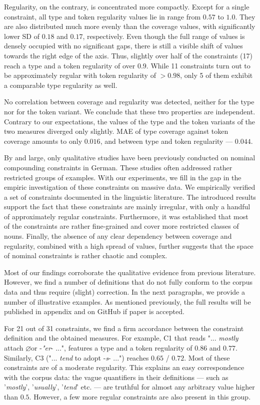 \documentclass[10pt, a4paper]{article}
\newcommand{\zeroLinker}{\ensuremath{\boldsymbol{\varnothing}}}
\begin{document}
Regularity, on the contrary, is concentrated more compactly. Except for a single constraint, all type and token regularity values lie in range from $0.57$ to $1.0$. They are also distributed much more evenly than the coverage values, with significantly lower SD of $0.18$ and $0.17$, respectively. Even though the full range of values is densely occupied with no significant gaps, there is still a visible shift of values towards the right edge of the axis. Thus, slightly over half of the constraints (17) reach a type and a token regularity of over $0.9$. While 11 constraints turn out to be approximately regular with token regularity of $>0.98$, only 5 of them exhibit a comparable type regularity as well.

No correlation between coverage and regularity was detected, neither for the type nor for the token variant. We conclude that these two properties are independent. Contrary to our expectations, the values of the type and the token variants of the two measures diverged only slightly. MAE of type coverage against token coverage amounts to only $0.016$, and between type and token regularity --- $0.044$.

By and large, only qualitative studies have been previously conducted on nominal compounding constraints in German. These studies often addressed rather restricted groups of examples. With our experiments, we fill in the gap in the empiric investigation of these constraints on massive data. We empirically verified a set of constraints documented in the linguistic literature. The introduced results support the fact that these constraints are mainly irregular, with only a handful of approximately regular constraints. Furthermore, it was established that most of the constraints are rather fine-grained and cover more restricted classes of nouns. Finally, the absence of any clear dependency between coverage and regularity, combined with a high spread of values, further suggests that the space of nominal constraints is rather chaotic and complex.

Most of our findings corroborate the qualitative evidence from previous literature. However, we find a number of definitions that do not fully conform to the corpus data and thus require (slight) correction. In the next paragraphs, we provide a number of illustrative examples. As mentioned previously, the full results will be published in appendix and on GitHub if paper is accepted.

For 21 out of 31 constraints, we find a firm accordance between the constraint definition and the obtained measures. For example, C1 that reads  "... \textit{mostly} attach \zeroLinker or -\textit{"er}- ...", features a type and a token regularity of $0.86$ and $0.77$. Similarly, C3 ("... \textit{tend} to adopt -\textit{s}- ...") reaches $0.65$ / $0.72$. Most of these constraints are of a moderate regularity. This explains an easy correspondence with the corpus data: the vague quantifiers in their definitions --- such as '\textit{mostly}', '\textit{usually}', '\textit{tend}' etc. --- are truthful for almost any arbitrary value higher than $0.5$. However, a few more regular constraints are also present in this group.
\end{document}
